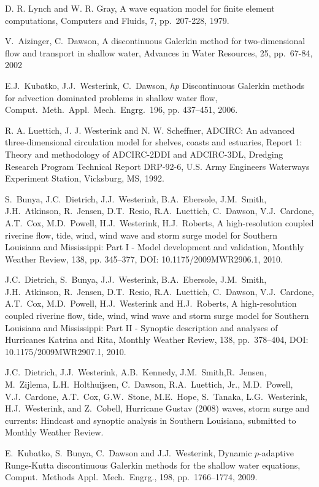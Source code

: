
\begin{thebibliography}{10}

 D. R. Lynch and W. R. Gray, A wave equation model for finite element computations, Computers and Fluids, 7, pp.\ 207-228, 1979.  

 V.~Aizinger, C.~Dawson, A discontinuous Galerkin method for two-dimensional flow and transport in shallow water, Advances in Water Resources, 25, pp.\ 67-84, 2002

 E.J.~Kubatko, J.J.~Westerink, C.~Dawson, $hp$ Discontinuous Galerkin methods for advection dominated problems in shallow water flow, Comput.~Meth.~Appl.~Mech.~Engrg.~196, pp. 437--451, 2006.

 R. A. Luettich, J. J. Westerink and N. W. Scheffner,  ADCIRC: An advanced three-dimensional circulation model for shelves, coasts and estuaries, Report 1: Theory and methodology of ADCIRC-2DDI and ADCIRC-3DL, Dredging Research Program Technical Report DRP-92-6, U.S. Army Engineers Waterways Experiment Station, Vicksburg, MS, 1992.  


 S.~Bunya, J.C.~Dietrich, J.J.~Westerink, B.A.~Ebersole, J.M.~Smith,  J.H.~Atkinson, R.~Jensen, D.T.~Resio, R.A.~Luettich, C.~Dawson, V.J.~Cardone, A.T.~Cox, M.D.~Powell, H.J.~Westerink, H.J.~Roberts, A high-resolution coupled riverine flow, tide, wind, wind wave and storm surge model for Southern Louisiana and Mississippi: Part I - Model development and validation, Monthly Weather Review, 138, pp. 345--377, DOI: 10.1175/2009MWR2906.1, 2010.  


 J.C.~Dietrich, S.~Bunya, J.J.~Westerink, B.A.~Ebersole, J.M.~Smith,  J.H.~Atkinson, R.~Jensen, D.T.~Resio, R.A.~Luettich, C.~Dawson, V.J.~Cardone, A.T.~Cox, M.D.~Powell, H.J.~Westerink and H.J.~Roberts, A high-resolution coupled riverine flow, tide, wind, wind wave and storm surge model for Southern Louisiana and Mississippi: Part II - Synoptic description and analyses of Hurricanes Katrina and Rita, Monthly Weather Review, 138, pp.\ 378--404, DOI: 10.1175/2009MWR2907.1, 2010.

 J.C.~Dietrich, J.J.~Westerink, A.B.~Kennedy, J.M.~Smith,R.~Jensen, M.~Zijlema, L.H.~Holthuijsen, C.~Dawson, R.A.~Luettich, Jr., M.D.~Powell, V.J.~Cardone, A.T.~Cox, G.W.~Stone, M.E.~Hope, S.~Tanaka, L.G.~Westerink, H.J.~Westerink, and Z.~Cobell, Hurricane Gustav (2008) waves, storm surge and currents:  Hindcast and synoptic analysis in Southern Louisiana, submitted to Monthly Weather Review.

 E.~Kubatko, S.~Bunya, C.~Dawson and J.J.~Westerink, Dynamic $p$-adaptive Runge-Kutta discontinuous Galerkin methods for the shallow water equations, Comput.~Methods Appl.~Mech.~Engrg., 198, pp.\ 1766--1774, 2009.

\end{thebibliography}